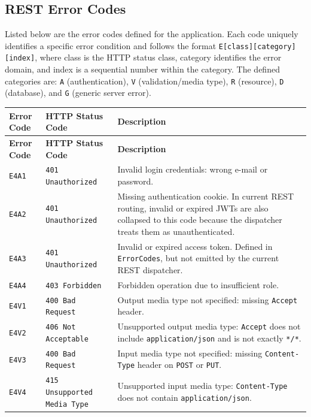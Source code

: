 \subsection{REST Error Codes}

Listed below are the error codes defined for the application. Each code uniquely identifies a specific error condition and follows the format \texttt{E[class][category][index]}, where class is the HTTP status class, category identifies the error domain, and index is a sequential number within the category. The defined categories are: \texttt{A} (authentication), \texttt{V} (validation/media type), \texttt{R} (resource), \texttt{D} (database), and \texttt{G} (generic server error).

\small
\begin{longtable}{|>{\raggedright\arraybackslash}p{}|>{\raggedright\arraybackslash}p{}|>{\raggedright\arraybackslash}p{}|}
\hline
\textbf{Error Code} & \textbf{HTTP Status Code} & \textbf{Description} \\
\hline
\endfirsthead
\hline
\textbf{Error Code} & \textbf{HTTP Status Code} & \textbf{Description} \\
\hline
\endhead
\texttt{E4A1} & \texttt{401 Unauthorized} & Invalid login credentials: wrong e-mail or password. \\
\hline
\texttt{E4A2} & \texttt{401 Unauthorized} & Missing authentication cookie. In current REST routing, invalid or expired JWTs are also collapsed to this code because the dispatcher treats them as unauthenticated. \\
\hline
\texttt{E4A3} & \texttt{401 Unauthorized} & Invalid or expired access token. Defined in \texttt{ErrorCodes}, but not emitted by the current REST dispatcher. \\
\hline
\texttt{E4A4} & \texttt{403 Forbidden} & Forbidden operation due to insufficient role. \\
\hline
\texttt{E4V1} & \texttt{400 Bad Request} & Output media type not specified: missing \texttt{Accept} header. \\
\hline
\texttt{E4V2} & \texttt{406 Not Acceptable} & Unsupported output media type: \texttt{Accept} does not include \texttt{application/json} and is not exactly \texttt{*/*}. \\
\hline
\texttt{E4V3} & \texttt{400 Bad Request} & Input media type not specified: missing \texttt{Content-Type} header on \texttt{POST} or \texttt{PUT}. \\
\hline
\texttt{E4V4} & \texttt{415 Unsupported} \texttt{Media Type} & Unsupported input media type: \texttt{Content-Type} does not contain \texttt{application/json}. \\

\end{longtable}
